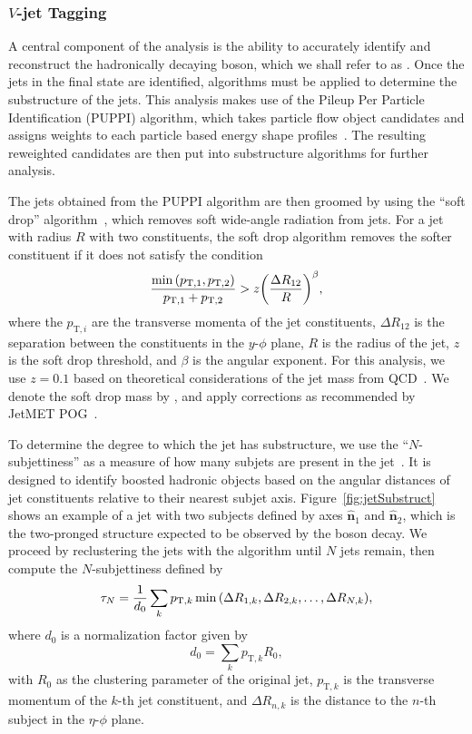 \subsubsection{$V$-jet Tagging}

A central component of the analysis is the ability to accurately identify and reconstruct the hadronically decaying \VorH boson, which we shall refer to as \Vhad.
Once the jets in the final state are identified, algorithms must be applied to determine the substructure of the jets.
This analysis makes use of the Pileup Per Particle Identification (PUPPI) algorithm, which takes particle flow object candidates and assigns weights to each particle based energy shape profiles~\cite{Bertolini_2014}.
The resulting reweighted candidates are then put into substructure algorithms for further analysis.

The jets obtained from the PUPPI algorithm are then groomed by using the ``soft drop'' algorithm~\cite{Larkoski_2014}, which removes soft wide-angle radiation from jets.
For a jet with radius $R$ with two constituents, the soft drop algorithm removes the softer constituent if it does not satisfy the condition
\begin{equation}
  \frac{\min\pqty{p_{\mathrm{T},1},p_{\mathrm{T},2}}}{p_{\mathrm{T},1}+p_{\mathrm{T},2}}>z\pqty{\frac{\Delta R_{12}}{R}}^\beta,
\end{equation}
where the $p_{\mathrm{T},i}$ are the transverse momenta of the jet constituents, $\Delta R_{12}$ is the separation between the constituents in the $y$-$\phi$ plane, $R$ is the radius of the jet, $z$ is the soft drop threshold, and $\beta$ is the angular exponent.
For this analysis, we use $z=0.1$ based on theoretical considerations of the jet mass from QCD~\cite{Dasgupta_2013,Dasgupta_2013_2}.
We denote the soft drop mass by \MJ, and apply corrections as recommended by JetMET POG~\cite{WZ-tagging}.

To determine the degree to which the jet has substructure, we use the ``$N$-subjettiness'' as a measure of how many subjets are present in the jet~\cite{Thaler_2011,Thaler_2012}.
It is designed to identify boosted hadronic objects based on the angular distances of jet constituents relative to their nearest subjet axis.
Figure~\ref{fig:jetSubstruct} shows an example of a jet with two subjects defined by axes $\mathbf{\hat{n}}_1$ and $\mathbf{\hat{n}}_2$, which is the two-pronged structure expected to be observed by the \Vhad boson decay.
We proceed by reclustering the jets with the \kt algorithm until $N$ jets remain, then compute the $N$-subjettiness defined by
\begin{equation}
  \tau_N=\frac{1}{d_0}\sum_kp_{\mathrm{T},k}\min\pqty{\Delta R_{1,k},\Delta R_{2,k},\ldots,\Delta R_{N,k}},
\end{equation}
where $d_0$ is a normalization factor given by
\begin{equation}
  d_0=\sum_kp_{\mathrm{T},k}R_0,
\end{equation}
with $R_0$ as the clustering parameter of the original jet, $p_{\mathrm{T},k}$ is the transverse momentum of the $k$-th jet constituent, and $\Delta R_{n,k}$ is the distance to the $n$-th subject in the $\eta$-$\phi$ plane.

